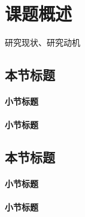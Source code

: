 \chapter{课题概述}
研究现状、研究动机

\section{本节标题}


\subsubsection{小节标题}


\subsubsection{小节标题}


\section{本节标题}

\subsubsection{小节标题}


\subsubsection{小节标题}


